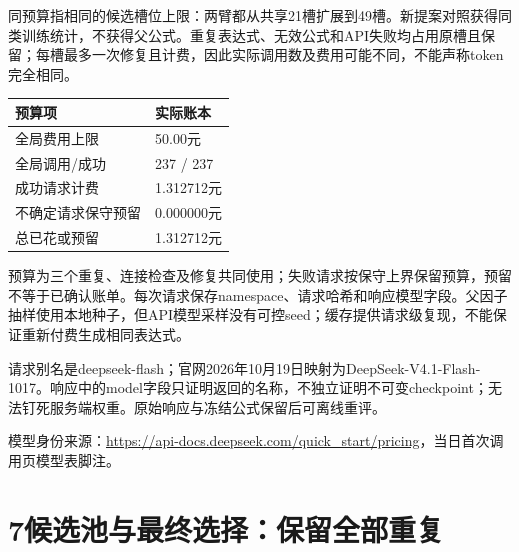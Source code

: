 \documentclass[UTF8,a4paper,10pt]{ctexart}
\newcommand{\page}[1]{\newpage\section*{#1}}
\begin{document}
同预算指相同的候选槽位上限：两臂都从共享21槽扩展到49槽。新提案对照获得同类训练统计，不获得父公式。重复表达式、无效公式和API失败均占用原槽且保留；每槽最多一次修复且计费，因此实际调用数及费用可能不同，不能声称token完全相同。

\begin{center}\small\begin{tabularx}{\textwidth}{p{60mm}X}\toprule
预算项 & 实际账本\\\midrule
全局费用上限 & 50.00元\\
全局调用/成功 & 237 / 237\\
成功请求计费 & 1.312712元\\
不确定请求保守预留 & 0.000000元\\
总已花或预留 & 1.312712元\\
\bottomrule\end{tabularx}\end{center}

预算为三个重复、连接检查及修复共同使用；失败请求按保守上界保留预算，预留不等于已确认账单。每次请求保存namespace、请求哈希和响应模型字段。父因子抽样使用本地种子，但API模型采样没有可控seed；缓存提供请求级复现，不能保证重新付费生成相同表达式。

请求别名是deepseek-flash；官网2026年10月19日映射为DeepSeek-V4.1-Flash-1017。响应中的model字段只证明返回的名称，不独立证明不可变checkpoint；无法钉死服务端权重。原始响应与冻结公式保留后可离线重评。

{\footnotesize 模型身份来源：\url{https://api-docs.deepseek.com/quick_start/pricing}，当日首次调用页模型表脚注。}\par

\page{7\quad 候选池与最终选择：保留全部重复}
\end{document}

